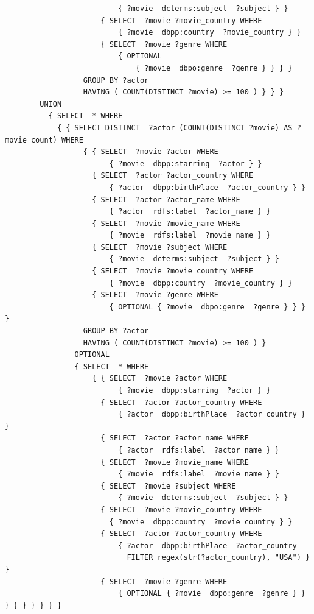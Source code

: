 \begin{lstlisting}
                          { ?movie  dcterms:subject  ?subject } }
                      { SELECT  ?movie ?movie_country WHERE
                          { ?movie  dbpp:country  ?movie_country } }
                      { SELECT  ?movie ?genre WHERE
                          { OPTIONAL
                              { ?movie  dbpo:genre  ?genre } } } }
                  GROUP BY ?actor
                  HAVING ( COUNT(DISTINCT ?movie) >= 100 ) } } }
        UNION
          { SELECT  * WHERE
            { { SELECT DISTINCT  ?actor (COUNT(DISTINCT ?movie) AS ?movie_count) WHERE
                  { { SELECT  ?movie ?actor WHERE
                        { ?movie  dbpp:starring  ?actor } }
                    { SELECT  ?actor ?actor_country WHERE
                        { ?actor  dbpp:birthPlace  ?actor_country } }
                    { SELECT  ?actor ?actor_name WHERE
                        { ?actor  rdfs:label  ?actor_name } }
                    { SELECT  ?movie ?movie_name WHERE
                        { ?movie  rdfs:label  ?movie_name } }
                    { SELECT  ?movie ?subject WHERE
                        { ?movie  dcterms:subject  ?subject } }
                    { SELECT  ?movie ?movie_country WHERE
                        { ?movie  dbpp:country  ?movie_country } }
                    { SELECT  ?movie ?genre WHERE
                        { OPTIONAL { ?movie  dbpo:genre  ?genre } } } }
                  GROUP BY ?actor
                  HAVING ( COUNT(DISTINCT ?movie) >= 100 ) }
                OPTIONAL
                { SELECT  * WHERE
                    { { SELECT  ?movie ?actor WHERE
                          { ?movie  dbpp:starring  ?actor } }
                      { SELECT  ?actor ?actor_country WHERE
                          { ?actor  dbpp:birthPlace  ?actor_country } }
                      { SELECT  ?actor ?actor_name WHERE
                          { ?actor  rdfs:label  ?actor_name } }
                      { SELECT  ?movie ?movie_name WHERE
                          { ?movie  rdfs:label  ?movie_name } }
                      { SELECT  ?movie ?subject WHERE
                          { ?movie  dcterms:subject  ?subject } }
                      { SELECT  ?movie ?movie_country WHERE
                        { ?movie  dbpp:country  ?movie_country } }
                      { SELECT  ?actor ?actor_country WHERE
                          { ?actor  dbpp:birthPlace  ?actor_country
                            FILTER regex(str(?actor_country), "USA") } }
                      { SELECT  ?movie ?genre WHERE
                          { OPTIONAL { ?movie  dbpo:genre  ?genre } } } } } } } } }
  \end{lstlisting}

